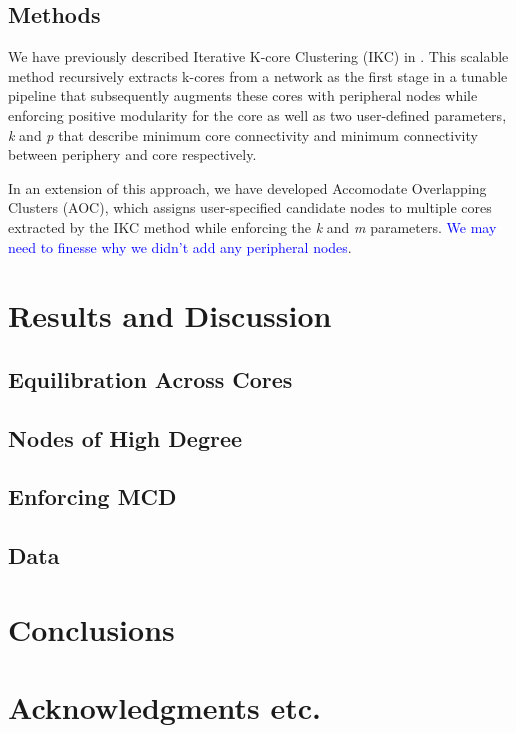 \documentclass{article}
\begin{document}
\subsection{Methods} We have previously described Iterative K-core Clustering (IKC) in \cite{Wedell2022}. This scalable method recursively extracts k-cores \cite{Giatsidis2011,malliaros2019} from a network as the first stage in a tunable pipeline that subsequently augments these cores with peripheral nodes while enforcing positive modularity for the core as well as two user-defined parameters, \emph{k} and \emph{p} that describe minimum core connectivity and minimum connectivity between periphery and core respectively.

In an extension of this approach, we have developed Accomodate Overlapping Clusters (AOC), which assigns user-specified candidate nodes to multiple cores extracted by the IKC method while enforcing the \emph{k} and \emph{m} parameters. \textcolor{blue}{We may need to finesse why we didn't add any peripheral nodes}.


\section{Results and Discussion}

\subsection{Equilibration Across Cores}

\subsection{Nodes of High Degree}

\subsection{Enforcing MCD}

\subsection{Data}

\section{Conclusions}
\section{Acknowledgments etc.}
\end{document}
